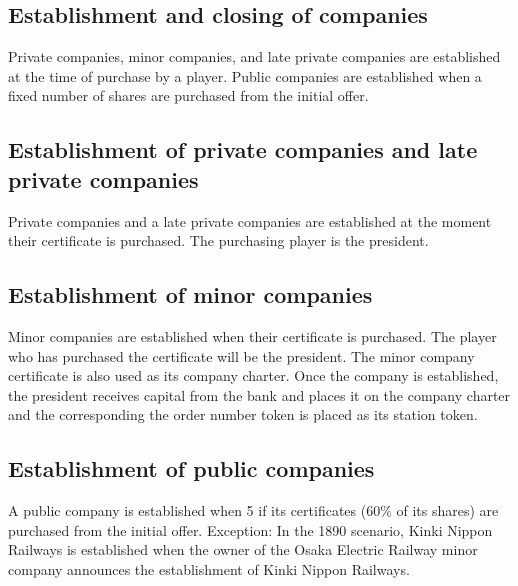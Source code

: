 \documentclass{article}
\begin{document}
\begin{CJK}{UTF8}{min}


\section{Establishment and closing of companies}
Private companies, minor companies, and late private companies are established at
the time of purchase by a player. Public companies are established
when a fixed number of shares are purchased from the initial offer.

\subsection{Establishment of private companies and late private companies}
Private companies and a late private companies are established at the
moment their certificate is purchased. The purchasing player is the
president.

\subsection{Establishment of minor companies}
Minor companies are established when their certificate is
purchased. The player who has purchased the certificate will be the
president. The minor company certificate is also used as its company
charter. Once the company is established, the
president receives capital from the bank and places it on the company
charter and the corresponding the order number token is placed as its
station token.

\subsection{Establishment of public companies}
A public company is established when 5 if its certificates (60\% of
its shares) are purchased from the initial offer. Exception: In the
1890 scenario, Kinki Nippon Railways is established when the owner of the
Osaka Electric Railway minor company announces the establishment of
Kinki Nippon Railways.


\end{CJK}
\end{document}
